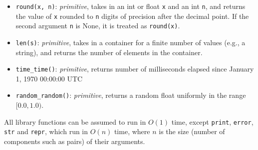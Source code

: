 \begin{itemize}
  \item
    \verb#round#\texttt{(x, n)}: \textit{primitive},
    takes in an int or float \texttt{x} and an int \texttt{n}, 
    and returns the value of \texttt{x} rounded to \texttt{n} digits of precision after the decimal point.
    If the second argument \texttt{n} is None, it is treated as \verb#round#\texttt{(x)}.

  \item
    \verb#len#\texttt{(s)}: \textit{primitive},
    takes in a container for a finite number of values (e.g., a string), and returns the number of elements in the container.

  \item
    \verb#time_time#\texttt{()}: \textit{primitive},
    returns number of milliseconds elapsed since
    January 1, 1970 00:00:00 UTC

  \item
    \verb#random_random#\texttt{()}: \textit{primitive},
    returns a random float uniformly in the range $[0.0, 1.0)$.
  
\end{itemize}
All library functions can be assumed to run
in $O(1)$ time, except \texttt{print}, \texttt{error}, \texttt{str} and \texttt{repr},
which run in $O(n)$ time, where $n$ is
the size (number of components such as pairs) of their arguments.
